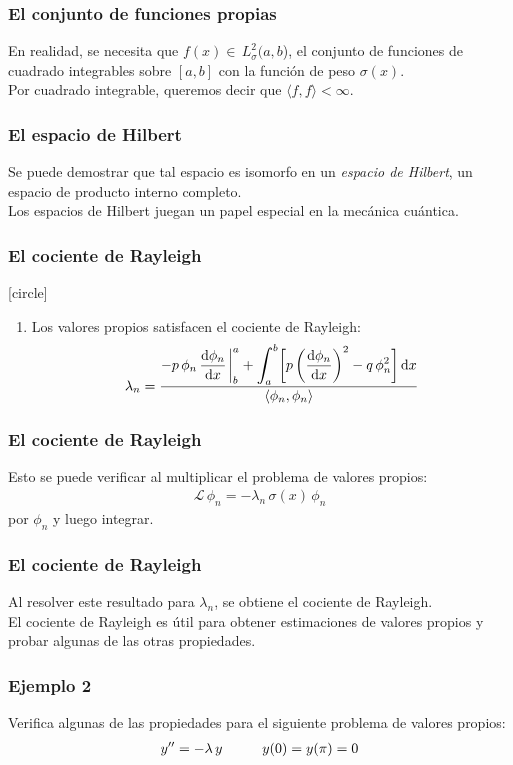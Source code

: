 \documentclass[12pt]{beamer}
\begin{document}
\begin{frame}
\frametitle{El conjunto de funciones propias}
En realidad, se necesita que $f (x) \in \, L_{\sigma}^{2} (a, b$), el conjunto de funciones de cuadrado integrables sobre $[a, b]$ con la función de peso $\sigma (x)$.
\\
\bigskip
\pause
Por cuadrado integrable, queremos decir que $\langle f,  f \rangle < \infty$.
\end{frame}
\begin{frame}
\frametitle{El espacio de Hilbert}
Se puede demostrar que tal espacio es isomorfo en un \emph{espacio de Hilbert}, un espacio de producto interno completo.
\\
\bigskip
\pause
Los espacios de Hilbert juegan un papel especial en la mecánica cuántica.
\end{frame}
\begin{frame}
\frametitle{El cociente de Rayleigh}
[circle]
\begin{enumerate}[<+->]
\conti
\item Los valores propios satisfacen el cociente de Rayleigh:
\pause
\begin{align*}
\lambda_{n} = \dfrac{- p \, \phi_{n} \, \displaystyle \dv{\phi_{n}}{x} \eval_{b}^{a} + \scaleint{6ex}_{\bs a}^{b} \bigg[ p \left( \dv{\phi_{n}}{x} \right)^{2} - q \, \phi_{n}^{2} \bigg] \dd{x}}{\langle  \phi_{n}, \phi_{n} \rangle} 
\end{align*}
\seti
\end{enumerate}
\end{frame}
\begin{frame}
\frametitle{El cociente de Rayleigh}
Esto se puede verificar al multiplicar el problema de valores propios:
\pause
\begin{align*}
\mathcal{L} \, \phi_{n} = - \lambda_{n} \, \sigma(x) \, \phi_{n}
\end{align*}
por $\phi_{n}$ y luego integrar.
\end{frame}
\begin{frame}
\frametitle{El cociente de Rayleigh}
Al resolver este resultado para $\lambda_{n}$, se obtiene el cociente de Rayleigh.
\\
\bigskip
\pause
El cociente de Rayleigh es útil para obtener estimaciones de valores propios y probar algunas de las otras propiedades.
\end{frame}
\begin{frame}
\frametitle{Ejemplo 2}
Verifica algunas de las propiedades para el siguiente problema de valores propios:
\pause
\begin{align*}
{y}^{\prime \prime} = - \lambda \, y \hspace{1cm} y(0) = y(\pi) = 0
\end{align*}
\end{frame}
\end{document}
